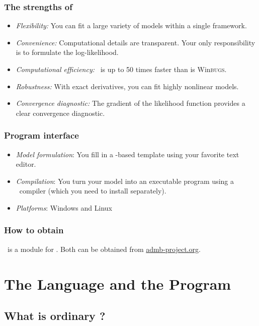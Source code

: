 \documentclass{admbmanual}
\newcommand{\scWinBUGS}{Win\textsc{bugs}}
\begin{document}
\subsection{The strengths of \scAR}

\begin{itemize}
\item \textit{Flexibility:} You can fit a large variety of models within a
single framework.
\item \textit{Convenience:} Computational details are transparent. Your only
responsibility is to formulate the log-likelihood.
\item \textit{Computational efficiency:} \scAR\ is up to 50 times faster
than is \scWinBUGS.
\item \textit{Robustness:} With exact derivatives, you can fit highly nonlinear
models.
\item \textit{Convergence diagnostic:} The gradient of the likelihood
function provides a clear convergence diagnostic.
\end{itemize}

\subsection{Program interface}

\begin{itemize}
\item\textit{Model formulation}: You fill in a \cplus-based template using your
favorite text editor.

\item \textit{Compilation}: You turn your model into an executable program using
a  \cplus\ compiler (which you need to install separately).

\item\textit{Platforms}: Windows and Linux
\end{itemize}

\subsection{How to obtain \scAR}

\scAR\ is a module for \scAB. Both can be obtained from
\href{admb-project.org}{admb-project.org}.

\chapter{The Language and the Program}

\section{What is ordinary \scAB?}
\end{document}
